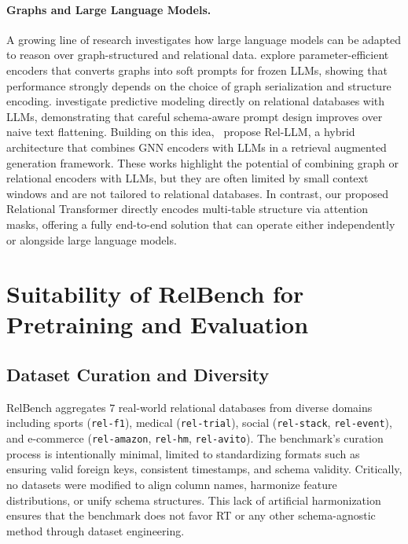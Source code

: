 \paragraph{Graphs and Large Language Models.}
A growing line of research investigates how large language models can be adapted to reason over graph-structured and relational data. \cite{fatemitalk,perozzi2024let} explore parameter-efficient encoders that converts graphs into soft prompts for frozen LLMs, showing that performance strongly depends on the choice of graph serialization and structure encoding. \cite{snowflake2024relational} investigate predictive modeling directly on relational databases with LLMs, demonstrating that careful schema-aware prompt design improves over naive text flattening. Building on this idea,~\cite{relllm} propose Rel-LLM, a hybrid architecture that combines GNN encoders with LLMs in a retrieval augmented generation framework. These works highlight the potential of combining graph or relational encoders with LLMs, but they are often limited by small context windows and are not tailored to relational databases. In contrast, our proposed Relational Transformer directly encodes multi-table structure via attention masks, offering a fully end-to-end solution that can operate either independently or alongside large language models.


\section{Suitability of RelBench for Pretraining and Evaluation}
\label{app:relbench_suitability}

\subsection{Dataset Curation and Diversity}

RelBench aggregates $7$ real-world relational databases from diverse domains including sports (\texttt{rel-f1}), medical (\texttt{rel-trial}), social (\texttt{rel-stack}, \texttt{rel-event}), and e-commerce (\texttt{rel-amazon}, \texttt{rel-hm}, \texttt{rel-avito}). The benchmark's curation process is intentionally minimal, limited to standardizing formats such as ensuring valid foreign keys, consistent timestamps, and schema validity. Critically, no datasets were modified to align column names, harmonize feature distributions, or unify schema structures. This lack of artificial harmonization ensures that the benchmark does not favor RT or any other schema-agnostic method through dataset engineering.


